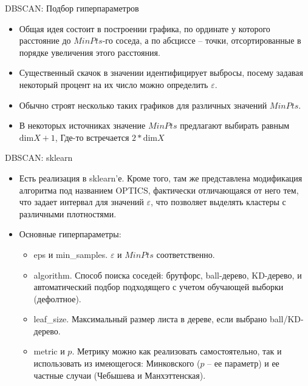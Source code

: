 \documentclass{beamer}
\begin{document}
\begin{frame}{DBSCAN: Подбор гиперпараметров}
    \small
    
    \begin{itemize}
        \item Общая идея состоит в построении графика, по ординате у которого расстояние до $MinPts$-го соседа, а по абсциссе -- точки, отсортированные в порядке увеличения этого расстояния.
        \item Существенный скачок в значении идентифицирует выбросы, посему задавая некоторый процент на их число можно определить $\varepsilon$. 
        \item Обычно строят несколько таких графиков для различных значений $MinPts$. 
        \item В некоторых источниках значение $MinPts$ предлагают выбирать равным $\text{dim}X + 1$, Где-то встречается $2 * \text{dim}X$
    \end{itemize}
\end{frame}

\begin{frame}{DBSCAN: sklearn}
    \small

    \begin{itemize}
        \item Есть реализация в sklearn'е. Кроме того, там же представлена модификация алгоритма под названием OPTICS, фактически отличающаяся от него тем, что задает интервал для значений $\varepsilon$, что позволяет выделять кластеры с различными плотностями.
        \item Основные гиперпараметры:
        \begin{itemize}
            \item eps и min\_samples. $\varepsilon$ и $MinPts$ соответственно.
            \item algorithm. Способ поиска соседей: брутфорс, ball-дерево, KD-дерево, и автоматический подбор подходящего с учетом обучающей выборки (дефолтное).
            \item leaf\_size. Максимальный размер листа в дереве, если выбрано ball/KD-дерево.
            \item metric и $p$. Метрику можно как реализовать самостоятельно, так и использовать из имеющегося: Минковского ($p$ -- ее параметр) и ее частные случаи (Чебышева и Манхэттенская).
        \end{itemize}       
    \end{itemize}
\end{frame}


\end{document}
